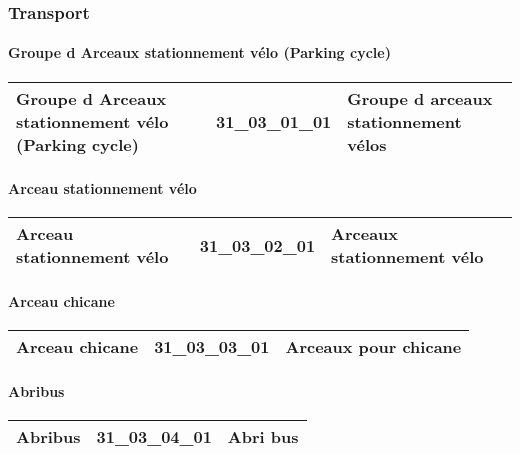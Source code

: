 \documentclass[12pt,titlepage]{book}
\begin{document}
\subsubsection{\large Transport}
\paragraph{Groupe d Arceaux stationnement vélo (Parking cycle)}
\noindent
\vspace{\baselineskip}

\renewcommand{\arraystretch}{1.2}
\begin{supertabular}{|p{10cm}|c|p{15cm}|}
 Groupe d Arceaux stationnement vélo (Parking cycle) & 31\_03\_01\_01 & Groupe d arceaux stationnement vélos\\
\hline
\end{supertabular}


\paragraph{Arceau stationnement vélo}
\noindent
\vspace{\baselineskip}

\renewcommand{\arraystretch}{1.2}
\begin{supertabular}{|p{10cm}|c|p{15cm}|}
 Arceau stationnement vélo & 31\_03\_02\_01 & Arceaux stationnement vélo\\
\hline
\end{supertabular}


\paragraph{Arceau chicane}
\noindent
\vspace{\baselineskip}

\renewcommand{\arraystretch}{1.2}
\begin{supertabular}{|p{10cm}|c|p{15cm}|}
 Arceau chicane & 31\_03\_03\_01 & Arceaux pour chicane\\
\hline
\end{supertabular}


\paragraph{Abribus}
\noindent
\vspace{\baselineskip}

\renewcommand{\arraystretch}{1.2}
\begin{supertabular}{|p{10cm}|c|p{15cm}|}
 Abribus & 31\_03\_04\_01 & Abri bus\\
\hline
\end{supertabular}
\end{document}
